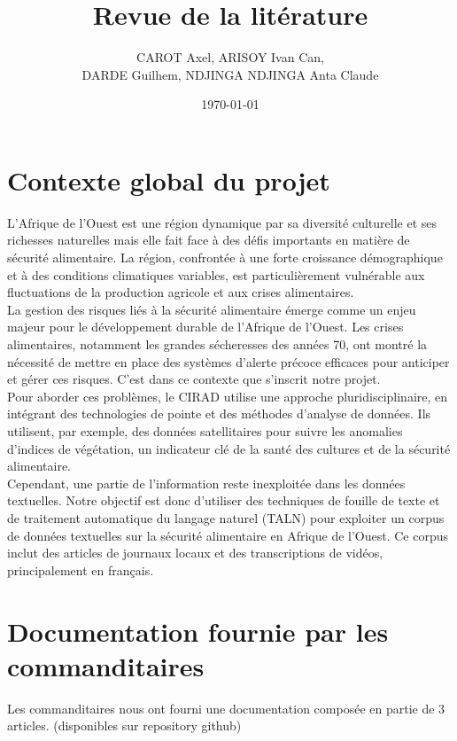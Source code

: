 \documentclass{article}
\title{Revue de la litérature}
\author{CAROT Axel, ARISOY Ivan Can, \\ DARDE Guilhem, NDJINGA NDJINGA Anta Claude}
\date{\today}
\begin{document}
\maketitle

\section{Contexte global du projet}
L'Afrique de l'Ouest est une région dynamique par sa diversité culturelle et ses richesses naturelles mais elle fait face à des défis importants en matière de sécurité alimentaire. La région, confrontée à une forte croissance démographique et à des conditions climatiques variables, est particulièrement vulnérable aux fluctuations de la production agricole et aux crises alimentaires. \\

La gestion des risques liés à la sécurité alimentaire émerge comme un enjeu majeur pour le développement durable de l'Afrique de l'Ouest. Les crises alimentaires, notamment les grandes sécheresses des années 70, ont montré la nécessité de mettre en place des systèmes d’alerte précoce efficaces pour anticiper et gérer ces risques. C’est dans ce contexte que s’inscrit notre projet. \\

Pour aborder ces problèmes, le CIRAD utilise une approche pluridisciplinaire, en intégrant des technologies de pointe et des méthodes d'analyse de données. Ils utilisent, par exemple, des données satellitaires pour suivre les anomalies d’indices de végétation, un indicateur clé de la santé des cultures et de la sécurité alimentaire. \\

Cependant, une partie de l'information reste inexploitée dans les données textuelles. Notre objectif est donc d'utiliser des techniques de fouille de texte et de traitement automatique du langage naturel (TALN) pour exploiter un corpus de données textuelles sur la sécurité alimentaire en Afrique de l'Ouest. Ce corpus inclut des articles de journaux locaux et des transcriptions de vidéos, principalement en français.

\section{Documentation fournie par les commanditaires}
Les commanditaires nous ont fourni une documentation composée en partie de 3 articles. (disponibles sur repository github)
\end{document}
